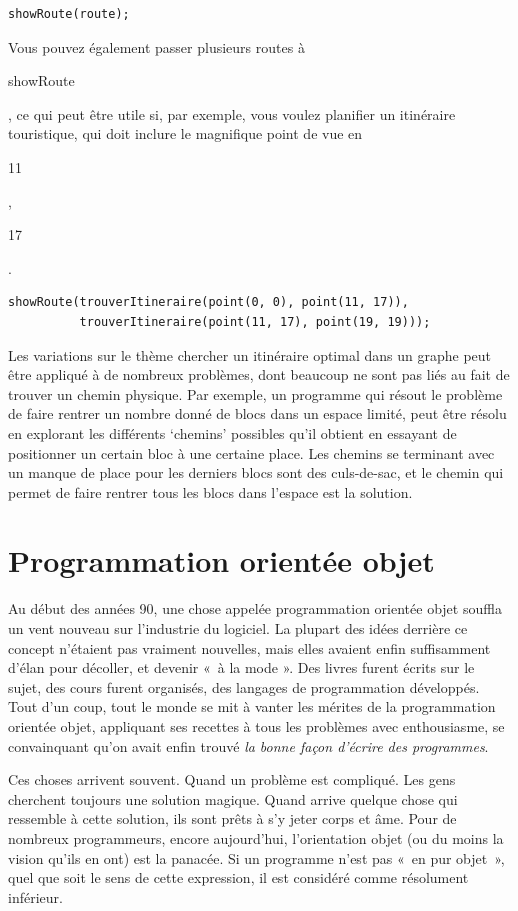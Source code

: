 \documentclass{FramateX}
\renewcommand{\texttt}[1]{\begin{sffamily}{#1}\end{sffamily}}
\begin{document}
\begin{lstlisting}
showRoute(route);
\end{lstlisting}
Vous pouvez également passer plusieurs routes à \texttt{showRoute}, ce
qui peut être utile si, par exemple, vous voulez planifier un itinéraire
touristique, qui doit inclure le magnifique point de vue en \texttt{11},
\texttt{17}.

\begin{lstlisting}
showRoute(trouverItineraire(point(0, 0), point(11, 17)),
          trouverItineraire(point(11, 17), point(19, 19)));
\end{lstlisting}
\begin{center}\end{center}

Les variations sur le thème chercher un itinéraire optimal dans un
graphe peut être appliqué à de nombreux problèmes, dont beaucoup ne sont
pas liés au fait de trouver un chemin physique. Par exemple, un
programme qui résout le problème de faire rentrer un nombre donné de
blocs dans un espace limité, peut être résolu en explorant les
différents `chemins' possibles qu'il obtient en essayant de positionner
un certain bloc à une certaine place. Les chemins se terminant avec un
manque de place pour les derniers blocs sont des culs-de-sac, et le
chemin qui permet de faire rentrer tous les blocs dans l'espace est la
solution.


\chapter{Programmation orientée objet}

Au début des années 90, une chose appelée programmation orientée objet
souffla un vent nouveau sur l'industrie du logiciel. La plupart des
idées derrière ce concept n'étaient pas vraiment nouvelles, mais elles
avaient enfin suffisamment d'élan pour décoller, et devenir «~à la mode
». Des livres furent écrits sur le sujet, des cours furent organisés,
des langages de programmation développés. Tout d'un coup, tout le monde
se mit à vanter les mérites de la programmation orientée objet,
appliquant ses recettes à tous les problèmes avec enthousiasme, se
convainquant qu'on avait enfin trouvé \emph{la bonne façon d'écrire des
programmes}.

Ces choses arrivent souvent. Quand un problème est compliqué. Les gens
cherchent toujours une solution magique. Quand arrive quelque chose qui
ressemble à cette solution, ils sont prêts à s'y jeter corps et âme.
Pour de nombreux programmeurs, encore aujourd'hui, l'orientation objet
(ou du moins la vision qu'ils en ont) est la panacée. Si un programme
n'est pas «~en pur objet~», quel que soit le sens de cette expression,
il est considéré comme résolument inférieur.
\end{document}
